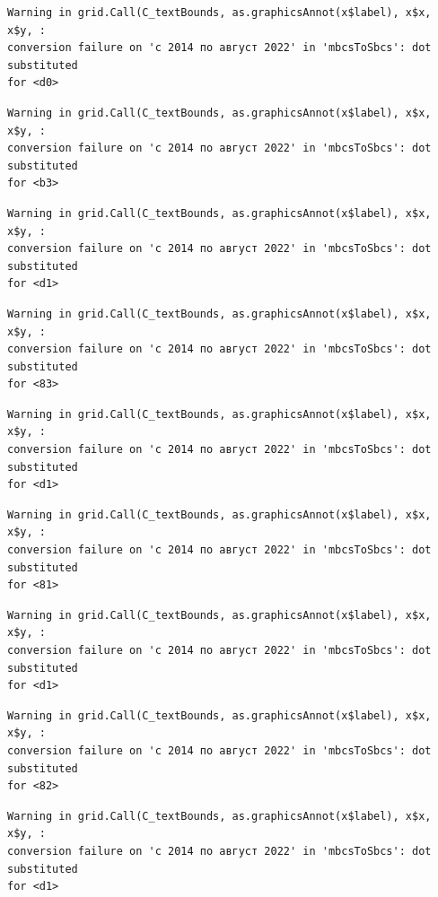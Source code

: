 \documentclass[
  letterpaper,
  DIV=11,
  numbers=noendperiod]{scrartcl}
\begin{document}
\begin{verbatim}
Warning in grid.Call(C_textBounds, as.graphicsAnnot(x$label), x$x, x$y, :
conversion failure on 'с 2014 по август 2022' in 'mbcsToSbcs': dot substituted
for <d0>
\end{verbatim}

\begin{verbatim}
Warning in grid.Call(C_textBounds, as.graphicsAnnot(x$label), x$x, x$y, :
conversion failure on 'с 2014 по август 2022' in 'mbcsToSbcs': dot substituted
for <b3>
\end{verbatim}

\begin{verbatim}
Warning in grid.Call(C_textBounds, as.graphicsAnnot(x$label), x$x, x$y, :
conversion failure on 'с 2014 по август 2022' in 'mbcsToSbcs': dot substituted
for <d1>
\end{verbatim}

\begin{verbatim}
Warning in grid.Call(C_textBounds, as.graphicsAnnot(x$label), x$x, x$y, :
conversion failure on 'с 2014 по август 2022' in 'mbcsToSbcs': dot substituted
for <83>
\end{verbatim}

\begin{verbatim}
Warning in grid.Call(C_textBounds, as.graphicsAnnot(x$label), x$x, x$y, :
conversion failure on 'с 2014 по август 2022' in 'mbcsToSbcs': dot substituted
for <d1>
\end{verbatim}

\begin{verbatim}
Warning in grid.Call(C_textBounds, as.graphicsAnnot(x$label), x$x, x$y, :
conversion failure on 'с 2014 по август 2022' in 'mbcsToSbcs': dot substituted
for <81>
\end{verbatim}

\begin{verbatim}
Warning in grid.Call(C_textBounds, as.graphicsAnnot(x$label), x$x, x$y, :
conversion failure on 'с 2014 по август 2022' in 'mbcsToSbcs': dot substituted
for <d1>
\end{verbatim}

\begin{verbatim}
Warning in grid.Call(C_textBounds, as.graphicsAnnot(x$label), x$x, x$y, :
conversion failure on 'с 2014 по август 2022' in 'mbcsToSbcs': dot substituted
for <82>
\end{verbatim}

\begin{verbatim}
Warning in grid.Call(C_textBounds, as.graphicsAnnot(x$label), x$x, x$y, :
conversion failure on 'с 2014 по август 2022' in 'mbcsToSbcs': dot substituted
for <d1>
\end{verbatim}
\end{document}
